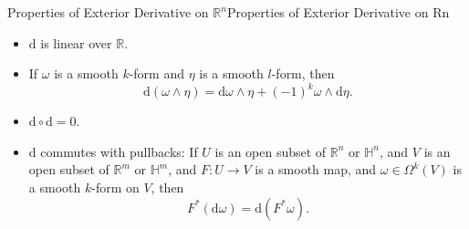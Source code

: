 \documentclass[../main.tex]{subfiles}
\begin{document}
\begin{proposition}{Properties of Exterior Derivative on $\mathbb{R}^n$}{Properties of Exterior Derivative on Rn}
  \begin{itemize}
    \item $\mathrm{d} $ is linear over $\mathbb{R}$.
    \item If $\omega$ is a smooth $k$-form and $\eta$ is a smooth $l$-form, then
      \begin{equation*}
        \mathrm{d} (\omega \wedge \eta) = \mathrm{d} \omega \wedge \eta + (-1)^k \omega \wedge \mathrm{d} \eta.
      \end{equation*}
    \item $\mathrm{d} \circ \mathrm{d} = 0$.
    \item $\mathrm{d} $ commutes with pullbacks: If $U$ is an open subset of $\mathbb{R}^n$ or $\mathbb{H}^n$, and $V$ is an open subset of $\mathbb{R}^m$ or $\mathbb{H}^m$, and $F: U \to V$ is a smooth map, and $\omega \in \Omega^k(V)$ is a smooth $k$-form on $V$, then
      \begin{equation*}
        F^*(\mathrm{d} \omega) = \mathrm{d} (F^* \omega).
      \end{equation*}
  \end{itemize}
\end{proposition}
\end{document}
